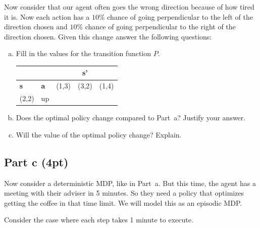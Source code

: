 \documentclass[12pt]{article}
\begin{document}
Now consider that our agent often goes the wrong direction because of
how tired it is. Now each action has a $10\%$ chance of going
perpendicular to the left of the direction chosen and $10\%$ chance of
going perpendicular to the right of the direction chosen. Given this
change answer the following questions:

\begin{enumerate}[a)]
\item Fill in the values for the transition function $P$.\\
    \begin{center}
    \begin{tabular}{|l|l|c|c|c|}\hline
      \multicolumn{2}{|c|}{} &
                               \multicolumn{3}{|c|}{\textbf{s'}}\\\hline
      \textbf{s} & \textbf{a} & (1,3) & (3,2) & (1,4)\\\hline
      (2,2) & up & & & \\ \hline
    \end{tabular}
  \end{center}
\item Does the optimal policy change compared to Part~a? Justify your
  answer.
\item Will the value of the optimal policy change? Explain.
\end{enumerate}

\subsection*{Part c (4pt)}

Now consider a deterministic MDP, like in Part~a. But this time, the
agent has a meeting with their adviser in 5 minutes. So they need a
policy that optimizes getting the coffee in that time limit. We will
model this as an episodic MDP.

Consider the case where each step takes 1 minute to execute.
\end{document}
